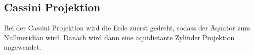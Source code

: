\subsection{Cassini Projektion}
\label{sec:cassini}
Bei der Cassini Projektion wird die Erde zuerst gedreht, sodass der Äquator zum Nullmeridian wird.
Danach wird dann eine äquidistante Zylinder Projektion angewendet. 